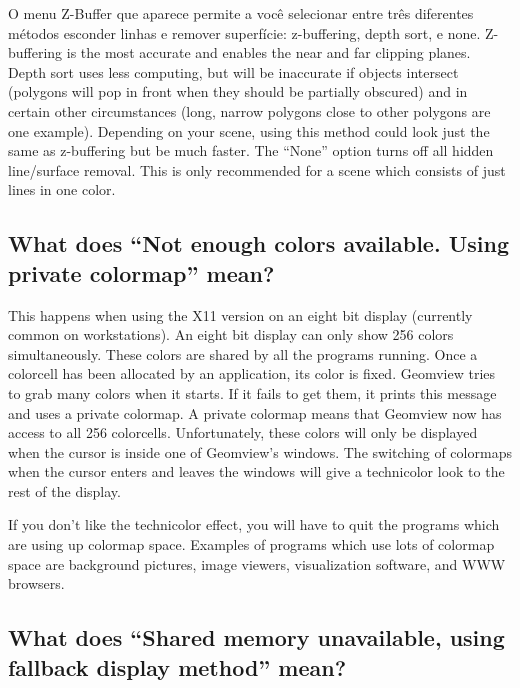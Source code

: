 \documentclass[12pt,a4paper]{article}
\begin{document}
        O menu Z-Buffer que aparece permite a voc\^e selecionar entre tr\^es diferentes
        m\'etodos esconder linhas e remover superf\'icie: z-buffering, depth sort, e
        none. Z-buffering is the most accurate and enables the near and far
        clipping planes. Depth sort uses less computing, but will be inaccurate
        if objects intersect (polygons will pop in front when they should be
        partially obscured) and in certain other circumstances (long, narrow
        polygons close to other polygons are one example). Depending on your
        scene, using this method could look just the same as z-buffering but be
        much faster. The ``None'' option turns off all hidden line/surface
        removal. This is only recommended for a scene which consists of just
        lines in one color.

    \subsection{What does ``Not enough colors available. Using private colormap'' mean?}

        This happens when using the X11 version on an eight bit display
        (currently common on workstations). An eight bit display can only show
        256 colors simultaneously. These colors are shared by all the programs
        running. Once a colorcell has been allocated by an application, its
        color is fixed. Geomview tries to grab many colors when it starts. If it
        fails to get them, it prints this message and uses a private colormap. A
        private colormap means that Geomview now has access to all 256
        colorcells. Unfortunately, these colors will only be displayed when the
        cursor is inside one of Geomview's windows. The switching of colormaps
        when the cursor enters and leaves the windows will give a technicolor
        look to the rest of the display.

        If you don't like the technicolor effect, you will have to quit the
        programs which are using up colormap space. Examples of programs which
        use lots of colormap space are background pictures, image viewers,
        visualization software, and WWW browsers.

    \subsection{What does ``Shared memory unavailable, using fallback display method'' mean?}
\end{document}
